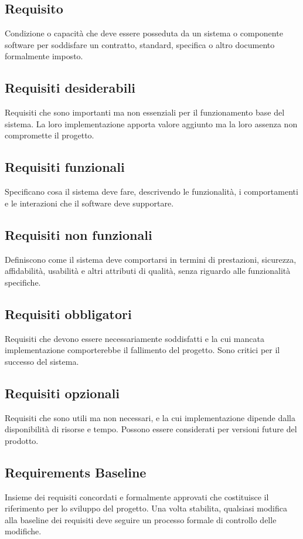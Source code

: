 \documentclass[a4paper,11pt]{article}
\begin{document}
\subsection{Requisito}
Condizione o capacità che deve essere posseduta da un sistema o componente software per soddisfare un contratto, standard, specifica o altro documento formalmente imposto.

\subsection{Requisiti desiderabili}
Requisiti che sono importanti ma non essenziali per il funzionamento base del sistema. La loro implementazione apporta valore aggiunto ma la loro assenza non compromette il progetto.

\subsection{Requisiti funzionali}
Specificano cosa il sistema deve fare, descrivendo le funzionalità, i comportamenti e le interazioni che il software deve supportare.

\subsection{Requisiti non funzionali}
Definiscono come il sistema deve comportarsi in termini di prestazioni, sicurezza, affidabilità, usabilità e altri attributi di qualità, senza riguardo alle funzionalità specifiche.

\subsection{Requisiti obbligatori}
Requisiti che devono essere necessariamente soddisfatti e la cui mancata implementazione comporterebbe il fallimento del progetto. Sono critici per il successo del sistema.

\subsection{Requisiti opzionali}
Requisiti che sono utili ma non necessari, e la cui implementazione dipende dalla disponibilità di risorse e tempo. Possono essere considerati per versioni future del prodotto.

\subsection{Requirements Baseline}
Insieme dei requisiti concordati e formalmente approvati che costituisce il riferimento per lo sviluppo del progetto. Una volta stabilita, qualsiasi modifica alla baseline dei requisiti deve seguire un processo formale di controllo delle modifiche.
\end{document}
